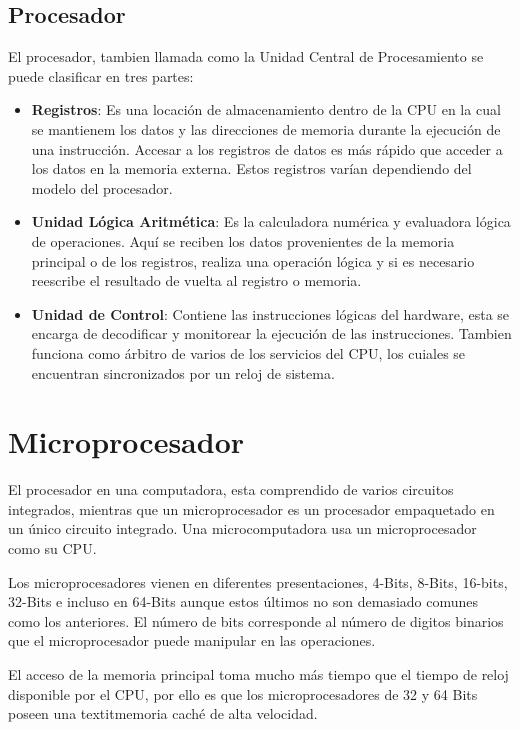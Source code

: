 \documentclass[letterpaper,12pt,oneside]{book}
\begin{document}
			\subsection{Procesador}
			El procesador, tambien llamada como la Unidad Central de Procesamiento se puede clasificar en tres partes:
		
			\begin{itemize}
				\item \textbf{Registros}: Es una locación de almacenamiento dentro de la CPU en la cual se mantienem los datos y las direcciones de memoria durante la ejecución de una instrucción. Accesar a los registros de datos es más rápido que acceder a los datos en la memoria externa. Estos registros varían dependiendo del modelo del procesador.

				\item \textbf{Unidad Lógica Aritmética}: Es la calculadora numérica y evaluadora lógica de operaciones. Aquí se reciben los datos provenientes de la memoria principal o de los registros, realiza una operación lógica y si es necesario reescribe el resultado de vuelta al registro o memoria.

				\item \textbf{Unidad de Control}: Contiene las instrucciones lógicas del hardware, esta se encarga de decodificar y monitorear la ejecución de las instrucciones. Tambien funciona como árbitro de varios de los servicios del CPU, los cuiales se encuentran sincronizados por un reloj de sistema.
			\end{itemize}

		\section{Microprocesador}
		El procesador en una computadora, esta comprendido de varios circuitos integrados, mientras que un microprocesador es un procesador empaquetado en un único circuito integrado. Una microcomputadora usa un microprocesador como su CPU.

		Los microprocesadores vienen en diferentes presentaciones, 4-Bits, 8-Bits, 16-bits, 32-Bits e incluso en 64-Bits aunque estos últimos no son demasiado comunes como los anteriores. El número de bits corresponde al número de digitos binarios que el microprocesador puede manipular en las operaciones.

		El acceso de la memoria principal toma mucho más tiempo que el tiempo de reloj disponible por el CPU, por ello es que los microprocesadores de 32 y 64 Bits poseen una textit{memoria caché} de alta velocidad.
\end{document}
